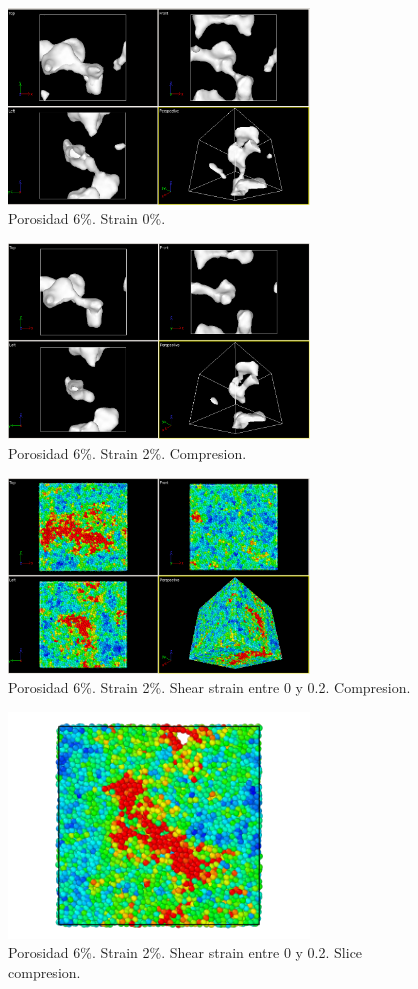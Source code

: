 \documentclass[10pt, oneside]{article} %
\begin{document}
\begin{figure}[H]
\centering
\includegraphics[width=8cm]{Figures/porosidad_6_muestra_0strain.png}
\caption{Porosidad 6\%. Strain 0\%.}
\end{figure}

\begin{figure}[H]
\centering
\includegraphics[width=8cm]{Figures/porosidad_6_muestra_2strain.png}
\caption{Porosidad 6\%. Strain 2\%. Compresion.}
\end{figure}

\begin{figure}[H]
\centering
\includegraphics[width=8cm]{Figures/porosidad_6_muestra_2strain_color_0_02.png}
\caption{Porosidad 6\%. Strain 2\%. Shear strain entre 0 y 0.2. Compresion.}
\end{figure}

\begin{figure}[H]
\centering
\includegraphics[width=8cm]{Figures/porosidad_6_muestra_2strain_color_slice_0_02.png}
\caption{Porosidad 6\%. Strain 2\%. Shear strain entre 0 y 0.2. Slice compresion.}
\end{figure}
\end{document}
